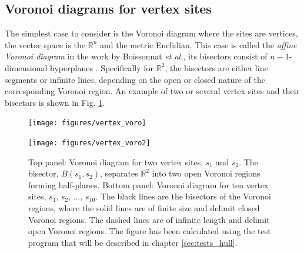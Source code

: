 \subsection{Voronoi diagrams for vertex sites}
The simplest case to consider is the Voronoi diagram where the sites are vertices, 
the vector space is the $\mathbb{R}^n$ and the metric Euclidian. This case is called the 
\textit{affine Voronoi diagram} in the work by Boissonnat \textit{et al.},
its bisectors consist of $n-1$-dimensional hyperplanes \cite[pp. 72-81]{Boissonnat2006}.
Specifically for $\mathbb{R}^2$, the bisectors are either line segments or infinite lines, 
depending on the open or closed nature of the corresponding Voronoi region.
An example of two or several vertex sites and their bisectors is shown in Fig. \ref{fig:vertex_voro}.

\begin{figure}[htb]
	\begin{minipage}{1 \textwidth}
		\begin{center}
			\texttt{[image: figures/vertex\_voro]}
		\end{center}
		\vspace{0.5cm}
		\begin{center}
			\texttt{[image: figures/vertex\_voro2]}
		\end{center}
	\end{minipage}
	\caption[Voronoi diagrams for vertices.]{
		Top panel: Voronoi diagram for two vertex sites, $s_1$ and $s_2$. 
			The bisector, $B\left(s_1, s_2\right)$, separates $\mathbb{R}^2$ 
			into two open Voronoi regions forming half-planes.
		Bottom panel: Voronoi diagram for ten vertex sites, $s_1,\, s_2,\, ...,\, s_{10}$.
		The black lines are the bisectors of the Voronoi regions, where the solid lines are of finite size
		and delimit closed Voronoi regions. The dashed lines are of infinite length and delimit open Voronoi regions.
		The figure has been calculated using the test program that will be described in chapter \ref{sec:tests_hull}.
		\label{fig:vertex_voro}}
\end{figure}


